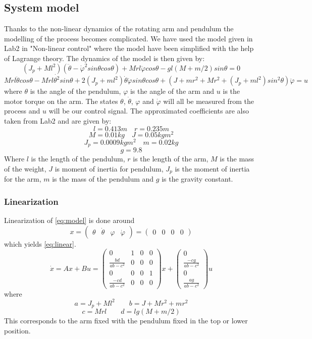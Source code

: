 \documentclass[10pt,a4paper]{article}
\begin{document}



\subsection{System model}
Thanks to the non-linear dynamics of the rotating arm and pendulum the modelling of the process becomes complicated. We have used the model given in Lab2 in "Non-linear control" where the model have been simplified with the help of Lagrange theory. The dynamics of the model is then given by:
$$(J_p + Ml^2)(\ddot{\theta} - \dot{\varphi} ^2sin\theta cos\theta )+Mrl\ddot{\varphi}cos\theta-gl(M+m/2)sin\theta = 0 $$
\begin{equation}
Mrl\ddot{\theta}cos\theta - Mrl\dot{\theta ^2}sin\theta + 2(J_p + ml^2 ) \dot{\theta} \dot{\varphi}sin\theta cos\theta + (J+mr^2 + Mr^2 + (J_p+ml^2)sin^2\theta)\ddot{\varphi}=u
\label{eq:model}
\end{equation}
where $\theta$ is the angle of the pendulum, $\varphi$ is the angle of the arm and $u$ is the motor torque on the arm. The states $\theta$, $\dot{\theta}$, $\varphi$ and $\dot{\varphi}$ will all be measured from the process and $u$ will be our control signal. The approximated coefficients are also taken from Lab2 and are given by:
$$l=0.413m \quad  r=0.235m$$
$$M=0.01kg \quad J=0.05kgm^2$$
$$J_p=0.0009kgm^2 \quad m=0.02kg$$
$$ g=9.8$$
Where $l$ is the length of the pendulum, $r$ is the length of the arm, $M$ is the mass of the weight, $J$ is moment of inertia  for pendulum, $J_p$ is the moment of inertia for the arm, $m$ is the mass of the pendulum and $g$ is the gravity constant.
\subsubsection{Linearization}
Linearization of \ref{eq:model} is done around
\begin{equation}
x =
\begin{pmatrix}
\theta & \dot\theta & \varphi & \dot\varphi
\end{pmatrix} = 
\begin{pmatrix}
0 & 0 & 0 & 0
\end{pmatrix}
\end{equation}
which yields \ref{eq:linear}.
\begin{equation}
\dot{x} = Ax + Bu =
\begin{pmatrix}
0 & 1 & 0  & 0 \\
\frac{bd}{ab-c^2} & 0 & 0 & 0 \\
0 & 0 & 0 & 1 \\
\frac{-cd}{ab-c^2} & 0 & 0 & 0
\end{pmatrix}x
+
\begin{pmatrix}
0 \\
\frac{-cg}{ab-c^2} \\
0 \\
\frac{ag}{ab-c^2}
\end{pmatrix}u
\label{eq:linear}
\end{equation}
where 
$$ a = J_p + M l^2 \qquad b = J + M r^2 + m r^2 $$
$$ c = M r l  \qquad d = l g (M + m/2) $$
This corresponds to the arm fixed with the pendulum fixed in the top or lower position.
\end{document}
